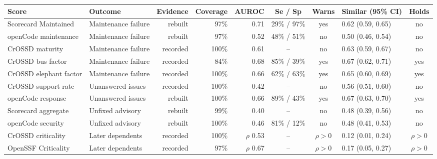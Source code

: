 \begin{tabular}{llrrrcclc}
\toprule
Score & Outcome & Evidence & Coverage & AUROC & Se / Sp & Warns & Similar (95\% CI) & Holds \\
\midrule
Scorecard Maintained & Maintenance failure & rebuilt & 97\% & 0.71 & 29\% / 97\% & yes & 0.62 (0.59, 0.65) & no \\
openCode maintenance & Maintenance failure & rebuilt & 97\% & 0.52 & 48\% / 51\% & no & 0.50 (0.46, 0.54) & no \\
CrOSSD maturity & Maintenance failure & recorded & 100\% & 0.61 & -- & no & 0.63 (0.59, 0.67) & no \\
CrOSSD bus factor & Maintenance failure & recorded & 84\% & 0.68 & 85\% / 39\% & yes & 0.67 (0.62, 0.71) & yes \\
CrOSSD elephant factor & Maintenance failure & recorded & 100\% & 0.66 & 62\% / 63\% & yes & 0.65 (0.60, 0.69) & yes \\
CrOSSD support rate & Unanswered issues & recorded & 100\% & 0.42 & -- & no & 0.56 (0.51, 0.60) & no \\
openCode response & Unanswered issues & rebuilt & 100\% & 0.66 & 89\% / 43\% & yes & 0.67 (0.63, 0.70) & yes \\
Scorecard aggregate & Unfixed advisory & rebuilt & 99\% & 0.40 & -- & no & 0.48 (0.39, 0.56) & no \\
openCode security & Unfixed advisory & rebuilt & 100\% & 0.46 & 81\% / 12\% & no & 0.48 (0.41, 0.53) & no \\
\midrule
CrOSSD criticality & Later dependents & recorded & 100\% & $\rho$ 0.53 & -- & $\rho>0$ & 0.12 (0.01, 0.24) & $\rho>0$ \\
OpenSSF Criticality & Later dependents & recorded & 97\% & $\rho$ 0.67 & -- & $\rho>0$ & 0.17 (0.05, 0.27) & $\rho>0$ \\
\bottomrule
\end{tabular}
